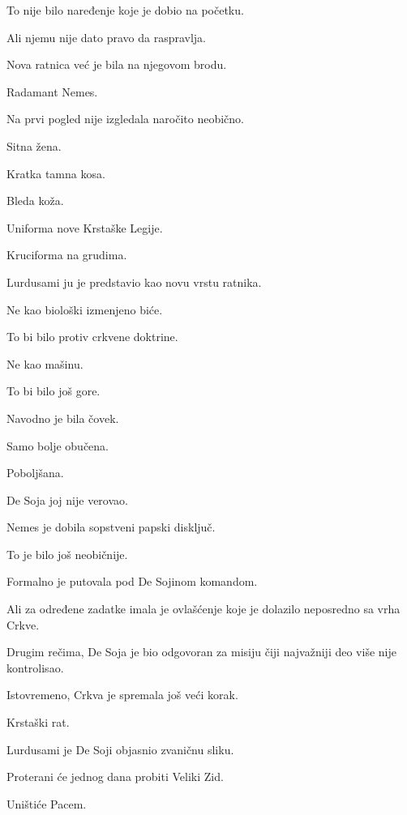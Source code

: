 To nije bilo naređenje koje je dobio na početku.

Ali njemu nije dato pravo da raspravlja.

\bigskip

Nova ratnica već je bila na njegovom brodu.

Radamant Nemes.

\bigskip

Na prvi pogled nije izgledala naročito neobično.

Sitna žena.

Kratka tamna kosa.

Bleda koža.

Uniforma nove Krstaške Legije.

Kruciforma na grudima.

\bigskip

Lurdusami ju je predstavio kao novu vrstu ratnika.

Ne kao biološki izmenjeno biće.

To bi bilo protiv crkvene doktrine.

Ne kao mašinu.

To bi bilo još gore.

\bigskip

Navodno je bila čovek.

Samo bolje obučena.

Poboljšana.

\bigskip

De Soja joj nije verovao.

\bigskip

Nemes je dobila sopstveni papski disključ.

To je bilo još neobičnije.

Formalno je putovala pod De Sojinom komandom.

Ali za određene zadatke imala je ovlašćenje koje je dolazilo neposredno sa vrha Crkve.

\bigskip

Drugim rečima, De Soja je bio odgovoran za misiju čiji najvažniji deo više nije kontrolisao.

\bigskip

Istovremeno, Crkva je spremala još veći korak.

Krstaški rat.

\bigskip

Lurdusami je De Soji objasnio zvaničnu sliku.

Proterani će jednog dana probiti Veliki Zid.

Uništiće Pacem.

